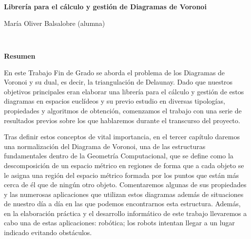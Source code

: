 \chapter*{}





\cleardoublepage

\chapter*{}

\pagestyle{empty}

\begin{center}
{\large\bfseries Librería para el cálculo y gestión de Diagramas de Voronoi}\\
\end{center}
\begin{center}
María Oliver Balsalobre (alumna)
\end{center}

\vspace{0.7cm}
\\

\vspace{0.7cm}


\centerline{\textbf{Resumen}}

\bigskip

En este Trabajo Fin de Grado se aborda el problema de los Diagramas de Voronoi y su dual, es decir, la triangulación de Delaunay. Dado que nuestros objetivos principales eran elaborar una librería para el cálculo y gestión de estos diagramas en espacios euclídeos y su previo estudio en diversas tipologías, propiedades y algoritmos de obtención, comenzamos el trabajo con una serie de resultados previos sobre los que hablaremos durante el transcurso del proyecto.

Tras definir estos conceptos de vital importancia, en el tercer capítulo daremos una normalización del Diagrama de Voronoi, una de las estructuras fundamentales dentro de la Geometría Computacional, que se define como la descomposición de un espacio métrico en regiones de forma que a cada objeto se le asigna una región del espacio métrico formada por los puntos que están más cerca de él que de ningún otro objeto. Comentaremos algunas de sus propiedades y las numerosas aplicaciones que utilizan estos diagramas además de situaciones de nuestro día a día en las que podemos encontrarnos esta estructura. Además, en la elaboración práctica y el desarrollo informático de este trabajo llevaremos a cabo una de estas aplicaciones: robótica; los robots intentan llegar a un lugar indicado evitando obstáculos.

